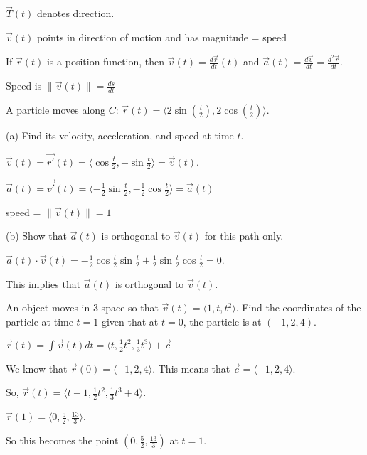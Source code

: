 \documentclass[../calc3.tex]{subfiles}
\begin{document}
$\vec{T}(t)$ denotes direction.

$\vec{v}(t)$ points in direction of motion and has magnitude = speed

If $\vec{r}(t)$ is a position function, then $\vec{v}(t)=\frac{d\vec{r}}{dt}(t)$ and $\vec{a}(t)=\frac{d\vec{v}}{dt} = \frac{d^2\vec{r}}{dt}$.

Speed is $\| \vec{v}(t)\| = \frac{ds}{dt}$

\pagebreak
\begin{example}
    A particle moves along $C$: $\vec{r}(t)=\langle 2\sin\left(\frac{t}{2}\right), 2\cos\left(\frac{t}{2}\right)\rangle$.

    (a) Find its velocity, acceleration, and speed at time $t$.

    $\vec{v}(t)=\vec{r'}(t)=\langle \cos \frac{t}{2}, -\sin\frac{t}{2}\rangle = \vec{v}(t)$.

    $\vec{a}(t)=\vec{v'}(t)=\langle -\frac{1}{2}\sin \frac{t}{2}, -\frac{1}{2}\cos \frac{t}{2}\rangle = \vec{a}(t)$

    speed = $\| \vec{v}(t)\| = 1$

    (b) Show that $\vec{a}(t)$ is orthogonal to $\vec{v}(t)$ for this path only.

    $\vec{a}(t)\cdot \vec{v}(t)=-\frac{1}{2}\cos \frac{t}{2}\sin \frac{t}{2}+\frac{1}{2}\sin \frac{t}{2}\cos \frac{t}{2}=0$.

    This implies that $\vec{a}(t)$ is orthogonal to $\vec{v}(t)$.
\end{example}

\begin{example}
    An object moves in 3-space so that $\vec{v}(t)=\langle 1,t,t^2\rangle$. Find the coordinates of the particle at time $t=1$ given that at $t=0$, the particle is at $(-1,2,4)$.

    $\vec{r}(t)=\int \vec{v}(t)dt = \langle t,\frac{1}{2}t^2,\frac{1}{3}t^3\rangle + \vec{c}$

    We know that $\vec{r}(0)=\langle -1,2,4\rangle$. This means that $\vec{c}=\langle -1,2,4\rangle$.

    So, $\vec{r}(t)=\langle t-1, \frac{1}{2}t^2, \frac{1}{3}t^3+4\rangle$.

    $\vec{r}(1)=\langle 0, \frac{5}{2}, \frac{13}{3}\rangle$.

    So this becomes the point $\left( 0,\frac{5}{2}, \frac{13}{3}\right)$ at $t=1$.
\end{example}
\end{document}
